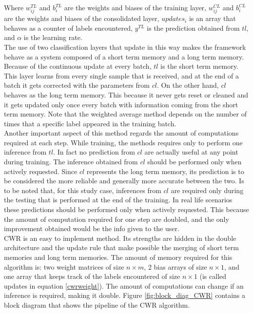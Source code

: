 \documentclass[12pt]{report}
\begin{document}
Where $w^{TL}_{ij}$ and $b^{TL}_i$ are the weights and biases of the training layer, $w^{CL}_{ij}$ and $b^{CL}_i$ are the weights and biases of the consolidated layer, $updates_{i}$ is an array that behaves as a counter of labels encountered, $y^{TL}$ is the prediction obtained from $tl$, and $\alpha$ is the learning rate.\\
The use of two classification layers that update in this way makes the framework behave as a system composed of a short term memory and a long term memory. Because of the continuous update at every batch, $tl$ is the short term memory. This layer learns from every single sample that is received, and at the end of a batch it gets corrected with the parameters from $cl$. On the other hand, $cl$ behaves as the long term memory. This because it never gets reset or cleaned and it gets updated only once every batch with information coming from the short term memory. Note that the weighted average method depends on the number of times that a specific label appeared in the training batch.\\
Another important aspect of this method regards the amount of computations required at each step. While training, the methods requires only to perform one inference from $tl$. In fact no prediction from $cl$ are actually useful at any point during training. The inference obtained from $cl$ should be performed only when actively requested. Since $cl$ represents the long term memory, its prediction is to be considered the more reliable and generally more accurate between the two. Is to be noted that, for this study case, inferences from $cl$ are required only during the testing that is performed at the end of the training. In real life scenarios these predictions should be performed only when actively requested. This because the amount of computation required for one step are doubled, and the only improvement obtained would be the info given to the user.\\
CWR is an easy to implement method. Its strengths are hidden in the double architecture and the update rule that make possible the merging of short term memories and long term memories. The amount of memory required for this algorithm is: two weight matrices of size $n \times m$, 2 bias arrays of size $n \times 1$, and one array that keeps track of the labels encountered of size $n \times 1$ (is called updates in equation \ref{cwrweight}). The amount of computations can change if an inference is required, making it double. Figure \ref{fig:block_diag_CWR} contains a block diagram that shows the pipeline of the CWR algorithm.
\end{document}

